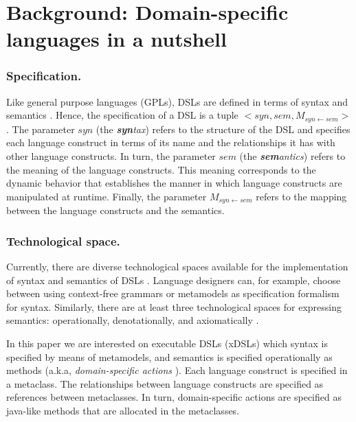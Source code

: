 \section{Background: Domain-specific languages in a nutshell}
\label{sec:background}

\subsubsection{Specification.} Like general purpose languages (GPLs), DSLs are defined in terms of syntax and semantics \cite{Harel:2004b}. Hence, the specification of a DSL is a tuple $<syn,sem,M_{syn\leftarrow sem}>$ \cite{Combemale:2013}. The parameter $syn$ (the \textit{\textbf{syn}tax}) refers to the structure of the DSL and specifies each language construct in terms of its name and the relationships it has with other language constructs. In turn, the parameter $sem$ (the \textit{\textbf{sem}antics}) refers to the meaning of the language constructs. This meaning corresponds to the dynamic behavior that establishes the manner in which language constructs are manipulated at runtime. Finally, the parameter $M_{syn\leftarrow sem}$ refers to the mapping between the language constructs and the semantics. 
 

\vspace{-3mm}
\subsubsection{Technological space.} Currently, there are diverse technological spaces available for the implementation of syntax and semantics of DSLs \cite{Mernik:2005b}. Language designers can, for example, choose between using context-free grammars or metamodels as specification formalism for syntax. Similarly, there are at least three technological spaces for expressing semantics: operationally, denotationally, and axiomatically \cite{Mosses:2001}.

In this paper we are interested on executable DSLs (xDSLs) which syntax is specified by means of metamodels, and semantics is specified operationally as methods (a.k.a, \textit{domain-specific actions} \cite{Combemale:2013}). Each language construct is specified in a metaclass. The relationships between language constructs are specified as references between metaclasses. In turn, domain-specific actions are specified as java-like methods that are allocated in the metaclasses.
 
\vspace{-3mm}
